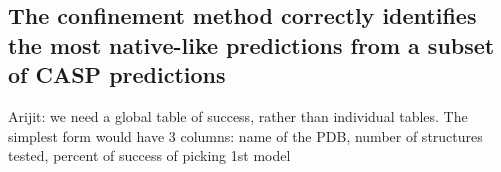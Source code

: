 \documentclass[12pt]{article}
\newcommand{\Alberto}[1]{\color{ForestGreen}#1\normalcolor }
\begin{document}


\subsection{The confinement method correctly identifies the most native-like predictions from a
subset of CASP predictions}
\Alberto{Arijit: we need a global table of success, rather than individual tables. The simplest form
    would have 3 columns: name of the PDB, number of structures tested, percent of success of
    picking 1st model}
\end{document}
